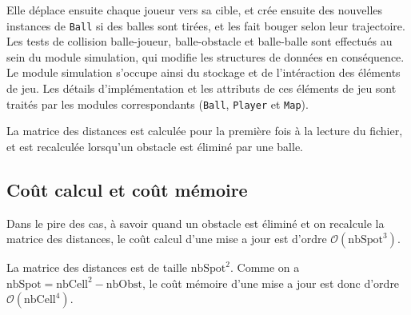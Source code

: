 \documentclass[a4paper, 11pt]{article}
\begin{document}
Elle déplace ensuite chaque joueur vers sa cible, et crée ensuite des nouvelles instances de \texttt{Ball} si des balles sont tirées, et les fait bouger selon leur trajectoire. 
Les tests de collision balle-joueur, balle-obstacle et balle-balle sont effectués au sein du module simulation, qui modifie les structures de données en conséquence. Le module simulation s'occupe ainsi du stockage et de l'intéraction des éléments de jeu. Les détails d'implémentation et les attributs de ces éléments de jeu sont traités par les modules correspondants (\texttt{Ball}, \texttt{Player} et \texttt{Map}).

La matrice des distances est calculée pour la première fois à la lecture du fichier, et est recalculée lorsqu'un obstacle est éliminé par une balle.

\subsection{Coût calcul et coût mémoire}

Dans le pire des cas, à savoir quand un obstacle est éliminé et on recalcule la matrice des distances, le coût calcul d'une mise a jour est d'ordre $\mathcal{O}(\text{nbSpot}^3)$. 

La matrice des distances est de taille $\text{nbSpot}^2$. Comme on a $\text{nbSpot} = \text{nbCell}^2 - \text{nbObst}$, le coût mémoire d'une mise a jour est donc d'ordre $\mathcal{O}(\text{nbCell}^4)$.
\end{document}
